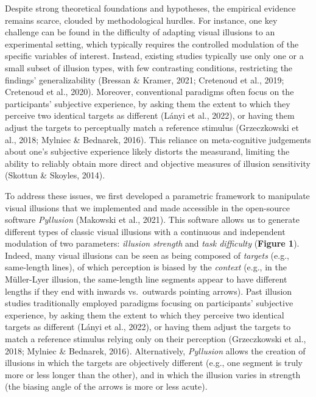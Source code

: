 \documentclass[
  man,floatsintext]{apa6}
\begin{document}
Despite strong theoretical foundations and hypotheses, the empirical evidence remains scarce, clouded by methodological hurdles. For instance, one key challenge can be found in the difficulty of adapting visual illusions to an experimental setting, which typically requires the controlled modulation of the specific variables of interest. Instead, existing studies typically use only one or a small subset of illusion types, with few contrasting conditions, restricting the findings' generalizability (Bressan \& Kramer, 2021; Cretenoud et al., 2019; Cretenoud et al., 2020). Moreover, conventional paradigms often focus on the participants' subjective experience, by asking them the extent to which they perceive two identical targets as different (Lányi et al., 2022), or having them adjust the targets to perceptually match a reference stimulus (Grzeczkowski et al., 2018; Mylniec \& Bednarek, 2016). This reliance on meta-cognitive judgements about one's subjective experience likely distorts the measurand, limiting the ability to reliably obtain more direct and objective measures of illusion sensitivity (Skottun \& Skoyles, 2014).

To address these issues, we first developed a parametric framework to manipulate visual illusions that we implemented and made accessible in the open-source software \emph{Pyllusion} (Makowski et al., 2021). This software allows us to generate different types of classic visual illusions with a continuous and independent modulation of two parameters: \emph{illusion strength} and \emph{task difficulty} (\textbf{Figure 1}). Indeed, many visual illusions can be seen as being composed of \emph{targets} (e.g., same-length lines), of which perception is biased by the \emph{context} (e.g., in the Müller-Lyer illusion, the same-length line segments appear to have different lengths if they end with inwards vs.~outwards pointing arrows). Past illusion studies traditionally employed paradigms focusing on participants' subjective experience, by asking them the extent to which they perceive two identical targets as different (Lányi et al., 2022), or having them adjust the targets to match a reference stimulus relying only on their perception (Grzeczkowski et al., 2018; Mylniec \& Bednarek, 2016). Alternatively, \emph{Pyllusion} allows the creation of illusions in which the targets are objectively different (e.g., one segment is truly more or less longer than the other), and in which the illusion varies in strength (the biasing angle of the arrows is more or less acute).
\end{document}
